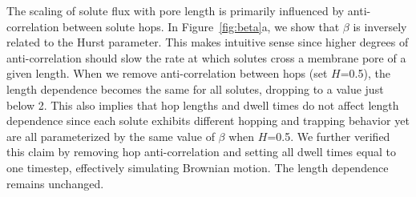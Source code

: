 \documentclass[journal=ancac3,manuscript=article,layout=twocolumn]{achemso}
\begin{document}
  The scaling of solute flux with pore length is primarily influenced by
  anti-correlation between solute hops. In Figure~\ref{fig:beta}a, we show that
  $\beta$ is inversely related to the Hurst parameter. This makes intuitive
  sense since higher degrees of anti-correlation should slow the rate at which
  solutes cross a membrane pore of a given length. When we remove anti-correlation between
  hops (set $H$=0.5), the length dependence becomes the same for all solutes,
  dropping to a value just below 2. This also implies that hop lengths and
  dwell times do not affect length dependence since each solute exhibits
  different hopping and trapping behavior yet are all parameterized by the same
  value of $\beta$ when $H$=0.5. We further verified this claim by removing
  hop anti-correlation and setting all dwell times equal to one timestep,
  effectively simulating Brownian motion.  The length dependence remains
  unchanged. 
\end{document}
